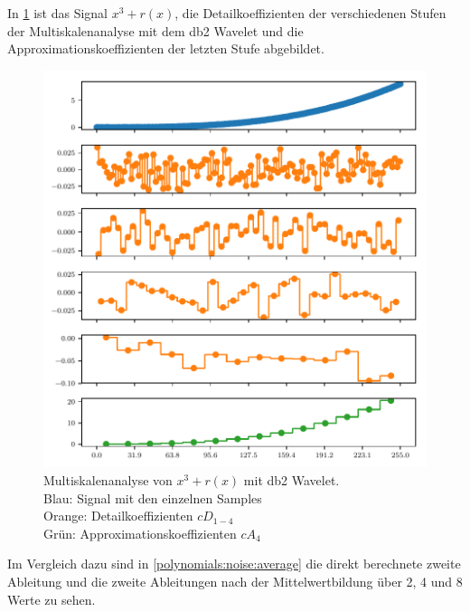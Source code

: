 \begin{refsection}
In \cref{polynomials:noise:db2_multi} ist das Signal $x^3 + r(x)$, die
Detailkoeffizienten der verschiedenen Stufen der Multiskalenanalyse mit dem db2
Wavelet und die Approximationskoeffizienten der letzten Stufe abgebildet.
\begin{figure}
    \centering
    \includegraphics{papers/polynomials/images/polynomials_noise_db2_multi.pdf}
    \caption{Multiskalenanalyse von $x^3 + r(x)$ mit db2 Wavelet. \\
             Blau: Signal mit den einzelnen Samples\\
             Orange: Detailkoeffizienten $cD_{1-4}$ \\
             Grün: Approximationskoeffizienten $cA_4$\label{polynomials:noise:db2_multi}}
\end{figure}
Im Vergleich dazu sind in \cref{polynomials:noise:average} die direkt
berechnete zweite Ableitung und die zweite Ableitungen nach der
Mittelwertbildung über 2, 4 und 8 Werte zu sehen.
\begin{figure}
    \centering

\end{figure}
\end{refsection}
